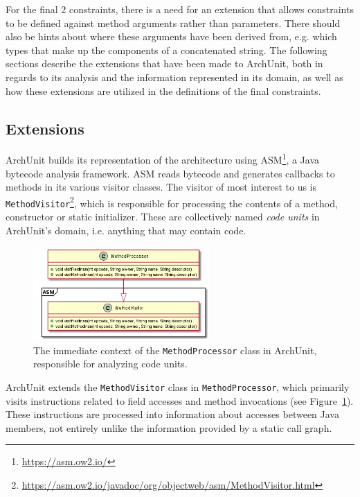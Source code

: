 For the final 2 constraints, there is a need for an extension that allows constraints to be defined against method arguments rather than parameters. There should also be hints about where these arguments have been derived from, e.g. which types that make up the components of a concatenated string. The following sections describe the extensions that have been made to ArchUnit, both in regards to its analysis and the information represented in its domain, as well as how these extensions are utilized in the definitions of the final constraints.

\subsection{Extensions}

ArchUnit builds its representation of the architecture using ASM\footnote{\url{https://asm.ow2.io/}}, a Java bytecode analysis framework. ASM reads bytecode and generates callbacks to methods in its various visitor classes. 
The visitor of most interest to us is \texttt{MethodVisitor}\footnote{\url{https://asm.ow2.io/javadoc/org/objectweb/asm/MethodVisitor.html}}, which is responsible for processing the contents of a method, constructor or static initializer. These are collectively named \textit{code units} in ArchUnit's domain, i.e. anything that may contain code.

\begin{figure}
    \centering
    \includegraphics[width=0.6\textwidth]{figure/extension/MethodProcessor1.png}
    \caption{The immediate context of the \texttt{MethodProcessor} class in ArchUnit, responsible for analyzing code units.}
    \label{fig:method_processor_1}
\end{figure}

ArchUnit extends the \texttt{MethodVisitor} class in \texttt{MethodProcessor}, which primarily visits instructions related to field accesses and method invocations (see Figure~\ref{fig:method_processor_1}). These instructions are processed into information about accesses between Java members, not entirely unlike the information provided by a static call graph.

